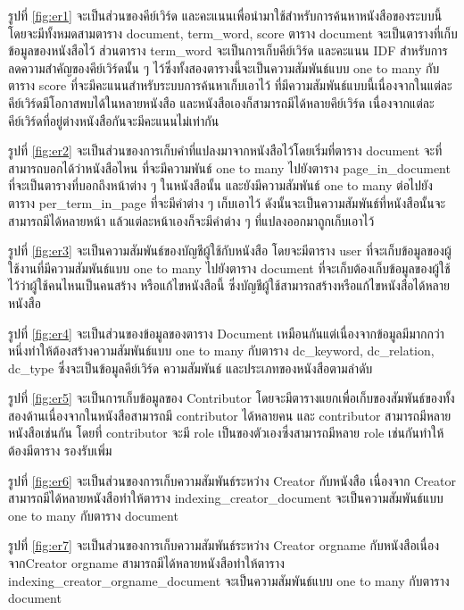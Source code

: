 รูปที่ \ref{fig:er1} จะเป็นส่วนของคีย์เวิร์ด และคะแนนเพื่อนำมาใช้สำหรับการค้นหาหนังสือของระบบนี้ โดยจะมีทั้งหมดสามตาราง document, term\_word, score ตาราง document จะเป็นตารางที่เก็บข้อมูลของหนังสือไว้ ส่วนตาราง term\_word จะเป็นการเก็บคีย์เวิร์ด และคะแนน IDF สำหรับการลดความสำคัญของคีย์เวิร์ดนั้น ๆ ไว้ซึ่งทั้งสองตารางนี้จะเป็นความสัมพันธ์แบบ one to many กับตาราง score ที่จะมีคะแนนสำหรับระบบการค้นหาเก็บเอาไว้ ที่มีความสัมพันธ์แบบนี้เนื่องจากในแต่ละคีย์เวิร์ดมีโอกาสพบได้ในหลายหนังสือ และหนังสือเองก็สามารถมีได้หลายคีย์เวิร์ด เนื่องจากแต่ละคีย์เวิร์ดที่อยู่ต่างหนังสือกันจะมีคะแนนไม่เท่ากัน

รูปที่ \ref{fig:er2} จะเป็นส่วนของการเก็บคำที่แปลงมาจากหนังสือไว้โดยเริ่มที่ตาราง document จะที่สามารถบอกได้ว่าหนังสือไหน ที่จะมีความพันธ์ one to many ไปยังตาราง page\_in\_document ที่จะเป็นตารางที่บอกถึงหน้าต่าง ๆ ในหนังสือนั้น และยังมีความสัมพันธ์ one to many ต่อไปยังตาราง per\_term\_in\_page ที่จะมีคำต่าง ๆ เก็บเอาไว้ ดังนั้นจะเป็นความสัมพันธ์ที่หนังสือนั้นจะสามารถมีได้หลายหน้า แล้วแต่ละหน้าเองก็จะมีคำต่าง ๆ ที่แปลงออกมาถูกเก็บเอาไว้

รูปที่ \ref{fig:er3} จะเป็นความสัมพันธ์ของบัญชีผู้ใช้กับหนังสือ โดยจะมีตาราง user ที่จะเก็บข้อมูลของผู้ใช้งานที่มีความสัมพันธ์แบบ one to many ไปยังตาราง document ที่จะเก็บต้องเก็บข้อมูลของผู้ใช้ไว้ว่าผู้ใช้คนไหนเป็นคนสร้าง หรือแก้ไขหนังสือนี้ ซึ่งบัญชีผู้ใช้สามารถสร้างหรือแก้ไขหนังสือได้หลายหนังสือ

รูปที่ \ref{fig:er4} จะเป็นส่วนของข้อมูลของตาราง Document เหมือนกันแต่เนื่องจากข้อมูลมีมากกว่าหนึ่งทำให้ต้องสร้างความสัมพันธ์แบบ one to many กับตาราง dc\_keyword, dc\_relation, dc\_type ซึ่งจะเป็นข้อมูลคีย์เวิร์ด ความสัมพันธ์ และประเภทของหนังสือตามลำดับ

รูปที่ \ref{fig:er5} จะเป็นการเก็บข้อมูลของ Contributor โดยจะมีตารางแยกเพื่อเก็บของสัมพันธ์ของทั้งสองด้านเนื่องจากในหนังสือสามารถมี contributor ได้หลายคน และ contributor สามารถมีหลายหนังสือเช่นกัน โดยที่ contributor จะมี role เป็นของตัวเองซึ่งสามารถมีหลาย role เช่นกันทำให้ต้องมีตาราง รองรับเพิ่ม

รูปที่ \ref{fig:er6} จะเป็นส่วนของการเก็บความสัมพันธ์ระหว่าง Creator กับหนังสือ เนื่องจาก Creator สามารถมีได้หลายหนังสือทำให้ตาราง indexing\_creator\_document จะเป็นความสัมพันธ์แบบ one to many กับตาราง document 

รูปที่ \ref{fig:er7} จะเป็นส่วนของการเก็บความสัมพันธ์ระหว่าง Creator orgname กับหนังสือเนื่อง จากCreator orgname สามารถมีได้หลายหนังสือทำให้ตาราง indexing\_creator\_orgname\_document จะเป็นความสัมพันธ์แบบ one to many กับตาราง document 

